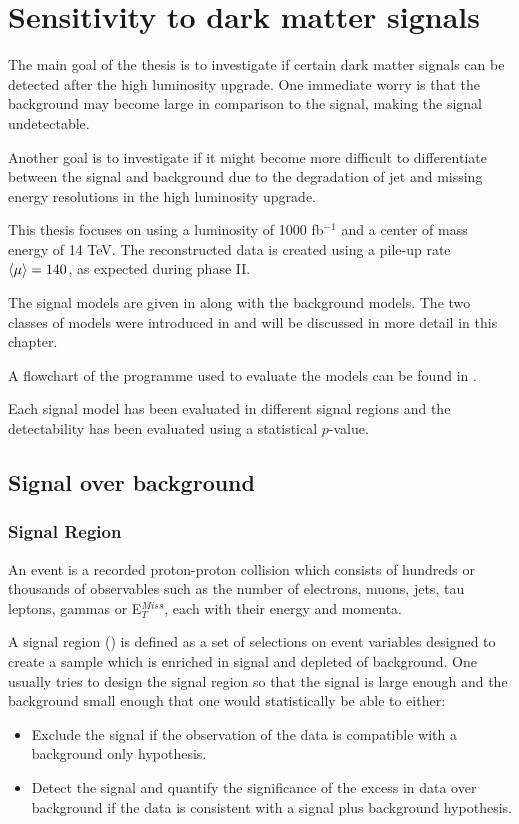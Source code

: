\chapter{Sensitivity to dark matter signals}\label{cha:darkmatter}

The main goal of the thesis is to investigate if certain dark matter signals can be detected after the high luminosity upgrade. One immediate worry is that the background may become large in comparison to the signal, making the signal undetectable.

Another goal is to investigate if it might become more difficult to differentiate between the signal and background due to the degradation of jet and missing energy resolutions in the high luminosity upgrade.

This thesis focuses on using a luminosity of 1000 fb$^{-1}$ and a center of mass energy of 14 TeV. The reconstructed data is created using a pile-up rate $\left<\mu\right> = 140$, as expected during phase II.

The signal models are given in  along with the background models. The two classes of models were introduced in  and will be discussed in more detail in this chapter. 

A flowchart of the programme used to evaluate the models can be found in .

Each signal model has been evaluated in different signal regions and the detectability has been evaluated using a statistical $p$-value. 

\newpage
\section{Signal over background}
\subsection{Signal Region}
An event is a recorded proton-proton collision which consists of hundreds or thousands of observables such as the number of electrons, muons, jets, tau leptons, gammas or E$^{Miss}_T$, each with their energy and momenta.

A signal region (\abbrSR) is defined as a set of selections on event variables designed to create a sample which is enriched in signal and depleted of background. One usually tries to design the signal region so that the signal is large enough and the background small enough that one would statistically be able to either:
\begin{itemize}
\item Exclude the signal if the observation of the data is compatible with a background only hypothesis.
\item Detect the signal and quantify the significance of the excess in data over background if the data is consistent with a signal plus background hypothesis.
\end{itemize}

